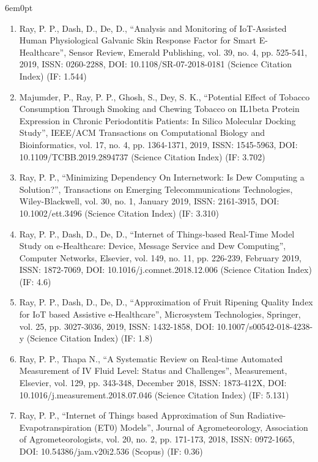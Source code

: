 \documentclass[11pt,a4paper]{moderncv}
\begin{document}
\begin{adjustwidth}{6em}{0pt}
\begin{enumerate}
		\item Ray, P. P., Dash, D., De, D., “Analysis and Monitoring of IoT-Assisted Human Physiological Galvanic Skin Response Factor for Smart E-Healthcare”, Sensor Review, Emerald Publishing, vol. 39, no. 4, pp. 525-541, 2019, ISSN: 0260-2288, DOI: 10.1108/SR-07-2018-0181 (Science Citation Index) (IF: 1.544) 
		
		\item Majumder, P., Ray, P. P., Ghosh, S., Dey, S. K., “Potential Effect of Tobacco Consumption Through Smoking and Chewing Tobacco on IL1beta Protein Expression in Chronic Periodontitis Patients: In Silico Molecular Docking Study”, IEEE/ACM Transactions on Computational Biology and Bioinformatics, vol. 17, no. 4, pp. 1364-1371, 2019, ISSN: 1545-5963, DOI: 10.1109/TCBB.2019.2894737 (Science Citation Index) (IF: 3.702)
		
		\item Ray, P. P., “Minimizing Dependency On Internetwork: Is Dew Computing a Solution?”, Transactions on Emerging Telecommunications Technologies, Wiley-Blackwell, vol. 30, no. 1, January 2019, ISSN: 2161-3915, DOI: 10.1002/ett.3496 (Science Citation Index) (IF: 3.310)
		
		\item Ray, P. P., Dash, D., De, D., “Internet of Things-based Real-Time Model Study on e-Healthcare: Device, Message Service and Dew Computing”, Computer Networks, Elsevier, vol. 149, no. 11, pp. 226-239, February 2019, ISSN: 1872-7069, DOI: 10.1016/j.comnet.2018.12.006 (Science Citation Index) (IF: 4.6)
		
		\item Ray, P. P., Dash, D., De, D., “Approximation of Fruit Ripening Quality Index for IoT based Assistive e-Healthcare”, Microsystem Technologies, Springer, vol. 25, pp. 3027-3036, 2019, ISSN: 1432-1858, DOI: 10.1007/s00542-018-4238-y (Science Citation Index) (IF: 1.8)
		
		\item Ray, P. P., Thapa N., “A Systematic Review on Real-time Automated Measurement of IV Fluid Level: Status and Challenges”, Measurement, Elsevier, vol. 129, pp. 343-348, December 2018, ISSN: 1873-412X, DOI: 10.1016/j.measurement.2018.07.046 (Science Citation Index) (IF: 5.131)
		
		\item Ray, P. P., “Internet of Things based Approximation of Sun Radiative-Evapotranspiration (ET0) Models”, Journal of Agrometeorology, Association of Agrometeorologists, vol. 20, no. 2, pp. 171-173, 2018, ISSN: 0972-1665, DOI: 10.54386/jam.v20i2.536 (Scopus) (IF: 0.36)
		

\end{enumerate}
\end{adjustwidth}
\end{document}
